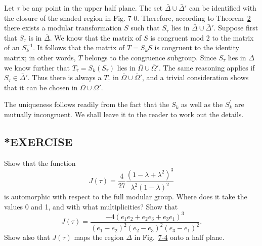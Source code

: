 Let $\tau$ be any point in the upper half plane. The set $\bar{\Delta} \cup \bar{\Delta}'$ can be identified with the closure of the shaded region in Fig. 7-0. Therefore, according to Theorem~\hyperref[thm:7.2]{2} there exists a modular transformation $S$ such that $S_{\tau}$ lies in $\bar{\Delta} \cup \bar{\Delta}'$. Suppose first that $S_{\tau}$ is in $\bar{\Delta}$. We know that the matrix of $S$ is congruent mod 2 to the matrix of an $S_k^{-1}$. It follows that the matrix of $T = S_k S$ is congruent to the identity matrix; in other words, $T$ belongs to the congruence subgroup. Since $S_{\tau}$ lies in $\bar{\Delta}$ we know further that $T_{\tau} = S_k(S_{\tau})$ lies in $\bar{\Omega} \cup \bar{\Omega}'$. The same reasoning applies if $S_{\tau} \in \bar{\Delta}'$. Thus there is always a $T_{\tau}$ in $\bar{\Omega} \cup \bar{\Omega}'$, and a trivial consideration shows that it can be chosen in $\bar{\Omega} \cup \Omega'$.

The uniqueness follows readily from the fact that the $S_{k}$ as well as the $S_{k}^{\prime}$ are mutually incongruent. We shall leave it to the reader to work out the details.

\subsection*{*EXERCISE}
Show that the function
\begin{equation*}
J (\tau) = \frac {4}{27} \frac {(1 - \lambda + \lambda^ {2}) ^ {3}}{\lambda^ {2} (1 - \lambda) ^ {2}}
\end{equation*}
is automorphic with respect to the full modular group. Where does it take the values 0 and 1, and with what multiplicities? Show that
\begin{equation*}
J (\tau) = \frac {- 4 (e _ {1} e _ {2} + e _ {2} e _ {3} + e _ {3} e _ {1}) ^ {3}}{(e _ {1} - e _ {2}) ^ {2} (e _ {2} - e _ {3}) ^ {2} (e _ {3} - e _ {1}) ^ {2}}.
\end{equation*}
Show also that $J(\tau)$ maps the region $\Delta$ in Fig.~\hyperref[fig:7-4]{7-4} onto a half plane.

